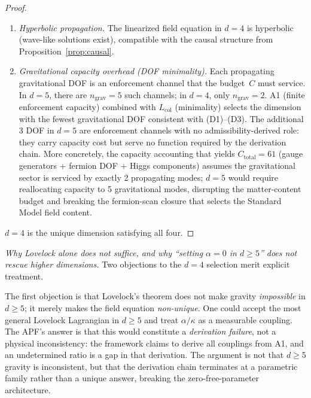 \documentclass[11pt,a4paper]{article}
\theoremstyle{definition}
\begin{document}
\begin{proof}
\begin{enumerate}[label=(D\arabic*),nosep]
  \item \textit{Hyperbolic propagation.}  The linearized field equation
  in $d = 4$ is hyperbolic (wave-like solutions exist), compatible with
  the causal structure from Proposition~\ref{prop:causal}.

  \item \textit{Gravitational capacity overhead (DOF minimality).}
  Each propagating gravitational DOF is an enforcement channel that the
  budget~$C$ must service.  In $d = 5$, there are $n_{\mathrm{grav}} =
  5$ such channels; in $d = 4$, only $n_{\mathrm{grav}} = 2$.  A1
  (finite enforcement capacity) combined with $L_{\mathrm{col}}$
  (minimality) selects the dimension with the fewest gravitational DOF
  consistent with (D1)--(D3).  The additional 3 DOF in $d = 5$ are
  enforcement channels with no admissibility-derived role: they carry
  capacity cost but serve no function required by the derivation chain.
  More concretely, the capacity accounting that yields
  $C_{\mathrm{total}} = 61$ (gauge generators + fermion DOF + Higgs
  components) assumes the gravitational sector is serviced by exactly 2
  propagating modes; $d = 5$ would require reallocating capacity to 5
  gravitational modes, disrupting the matter-content budget and breaking
  the fermion-scan closure that selects the Standard Model field
  content.
\end{enumerate}
$d = 4$ is the unique dimension satisfying all four.
\end{proof}

\smallskip\noindent\textit{Why Lovelock alone does not suffice, and
why ``setting $\alpha = 0$ in $d \ge 5$'' does not rescue higher
dimensions.}\quad
Two objections to the $d = 4$ selection merit explicit treatment.

The first objection is that Lovelock's theorem does not make gravity
\emph{impossible} in $d \ge 5$; it merely makes the field equation
\emph{non-unique}.  One could accept the most general Lovelock
Lagrangian in $d \ge 5$ and treat $\alpha/\kappa$ as a measurable
coupling.  The APF's answer is that this would constitute a
\emph{derivation failure}, not a physical inconsistency: the framework
claims to derive all couplings from A1, and an undetermined ratio is
a gap in that derivation.  The argument is not that $d \ge 5$ gravity
is inconsistent, but that the derivation chain terminates at a
parametric family rather than a unique answer, breaking the
zero-free-parameter architecture.
\end{document}
